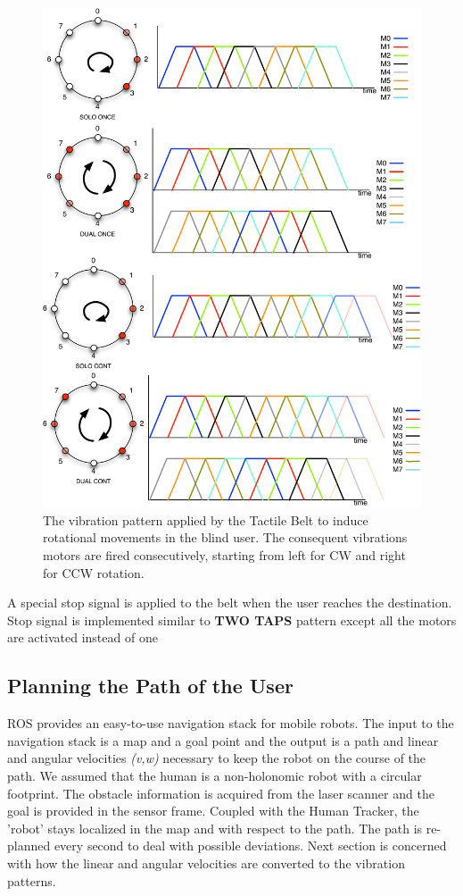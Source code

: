\begin{figure}[ht!]
\centering
\includegraphics[width=1.0\textwidth]{pics/vibration_pattern_solo_cont}
\caption{The vibration pattern applied by the Tactile Belt to induce rotational movements in the blind user. The consequent vibrations motors are fired consecutively, starting from left for CW and right for CCW rotation.}
\label{fig:vibration_pattern_solo_cont}
\end{figure}

A special stop signal is applied to the belt when the user reaches the destination. Stop signal is implemented similar to \textbf{TWO TAPS} pattern except all the motors are activated instead of one


\subsection{Planning the Path of the User}

ROS provides an easy-to-use navigation stack for mobile robots. The input to the navigation stack is a map and a goal point and the output is a path and linear and angular velocities \emph{(v,w)} necessary to keep the robot on the course of the path. We assumed that the human is a non-holonomic robot with a circular footprint. The obstacle information is acquired from the laser scanner and the goal is provided in the sensor frame. Coupled with the Human Tracker, the 'robot' stays localized in the map and with respect to the path. The path is re-planned every second to deal with possible deviations. Next section is concerned with how the linear and angular velocities are converted to the vibration patterns.

